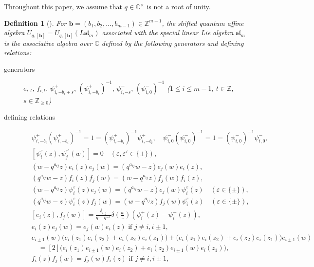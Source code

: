 \documentclass[12pt]{amsart}
\newtheorem{definition}[thm]{Definition}
\numberwithin{equation}{thm}
\newcommand\CC{\mathbb C}
\newcommand\ZZ{\mathbb Z}
\newcommand\bb{\mathbf b}
\renewcommand\d{\delta}  %
\newcommand\ve{\varepsilon}
\newcommand\Fsl{\mathfrak{sl}}
\newcounter{ni}
\begin{document}
Throughout this paper, we assume that $q \in \CC^{\times}$ is not a root of unity. 
\begin{definition}[{\cite[\S 5.1]{FT19}}] 
\label{def SQA} 
For $\bb =(b_1,b_2,\dots, b_{m-1}) \in \ZZ^{m-1}$,  
the shifted quantum affine algebra $U_{q,[\bb]} = U_{q,[\bb]}(L\Fsl_m)$ 
associated with the special linear Lie algebra $\Fsl_m$ 
is the associative algebra over $\CC$ defined by the following generators and defining relations: 
\begin{description}
\item[generators]  
$e_{i,t}, \, f_{i,t}, \, \psi_{i, -b_i +s}^+, \, (\psi^+_{i, - b_i})^{-1}, \, \psi_{i, -s}^-, \, (\psi_{i,0}^-)^{-1} $ 
($1\leq i \leq m-1$, $t \in \ZZ$, $s \in \ZZ_{\geq 0}$) 

\item[defining relations]  
\begin{align*}
&\tag{U1} 
\psi_{i, - b_i}^+ (\psi_{i, - b_i}^+)^{-1} = 1 = (\psi_{i, -b_i}^+)^{-1} \psi_{i,-b_i}^+,  
	\quad 
	\psi_{i,0}^- (\psi_{i,0}^-)^{-1} = 1 = (\psi_{i,0}^-)^{-1} \psi_{i,0}^-, 
	\\
	& [\psi_{i}^{\ve} (z), \psi_j^{\ve'} (w)] =0 \quad (\ve, \ve' \in \{ \pm\}), 
\\
&\tag{U2} 
(w - q^{a_{ij}} z) e_i (z) e_j (w) = (q^{a_{ij}} w - z) e_j (w) e_i (z), 
\\
&\tag{U3} 
(q^{a_{ij}} w - z) f_i(z) f_j(w) = (w- q^{a_{ij}} z) f_j(w) f_i(z), 
\\
&\tag{U4} 
(w - q^{a_{ij}} z) \psi_i^{\ve} (z) e_j(w) = (q^{a_{ij}} w - z) e_j (w) \psi_i^{\ve} (z) 
	\quad (\ve \in \{\pm\}), 
\\
&\tag{U5}  
(q^{a_{ij}} w - z) \psi_i^{\ve} (z) f_j (w) = (w - q^{a_{ij}} z) f_j (w) \psi_i^{\ve} (z) 
	\quad ( \ve \in \{\pm\}), 
\\
&\tag{U6} 
[e_i(z), f_j(w)] 
	= \frac{\d_{i,j}}{q-q^{-1}} \d \left( \frac{w}{z} \right) (\psi_i^+ (z) - \psi_i^- (z)), 
\\
&\tag{U7} 
e_i(z) e_j(w) = e_j(w) e_i(z)  \text{ if } j \not= i,  i \pm 1, 
	\\ & 
	e_{i\pm 1}(w) \big( e_i(z_1) e_i(z_2) + e_i(z_2) e_i(z_1) \big) + \big( e_i(z_1) e_i(z_2) + e_i(z_2) e_i(z_1) \big) e_{i\pm 1}(w) 
	\\ & \quad 
	= [2] \big( e_i (z_1) e_{i \pm 1} (w) e_i (z_2) + e_i (z_2) e_{i \pm 1} (w) e_i (z_1) \big),   
\\
&\tag{U8}   
f_i(z) f_j(w) = f_j(w) f_i(z)  \text{ if } j \not= i,  i \pm 1, 
	\\ & 

\end{align*}
\end{description}
\end{definition}
\end{document}
